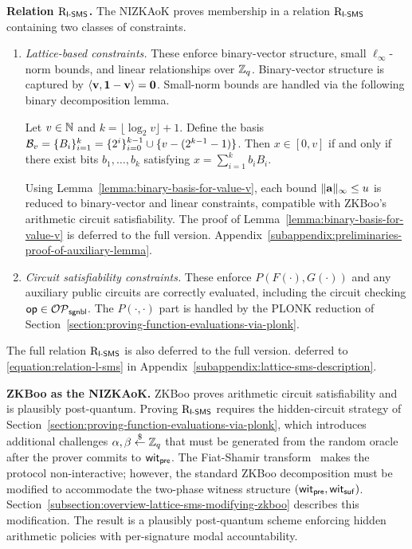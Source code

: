 \medskip
\noindent\textbf{Relation $\mathrm{R}_{\mathsf{l}\textsf{-}\mathsf{SMS}}$.}
The NIZKAoK proves membership in a relation $\mathrm{R}_{\mathsf{l}\textsf{-}\mathsf{SMS}}$
containing two classes of constraints.

\begin{enumerate}
\item \emph{Lattice-based constraints.}
These enforce binary-vector structure, small $\ell_\infty$-norm bounds,
and linear relationships over $\mathbb{Z}_q$.
Binary-vector structure is captured by $\left\langle\mathbf{v},\mathbf{1} - \mathbf{v}\right\rangle = \mathbf{0}$.
Small-norm bounds are handled via the following binary decomposition lemma.

\begin{lemma}%
	\label{lemma:binary-basis-for-value-v}
Let $v \in \mathbb{N}$ and $k = \lfloor \log_2 v \rfloor + 1$.
Define the basis
$\mathcal{B}_v = \{B_i\}_{i = 1}^k = \{2^i\}_{i = 0}^{k - 1} \cup \{v - (2^{k - 1} - 1)\}$.
Then $x \in [0, v]$ if and only if there exist bits $b_1, \ldots, b_k$
satisfying $x = \sum_{i = 1}^k b_i B_i$.
\end{lemma}

Using Lemma~\ref{lemma:binary-basis-for-value-v},
each bound $\|\mathbf{a}\|_\infty \leq u$ is reduced to binary-vector
and linear constraints,
compatible with ZKBoo's arithmetic circuit satisfiability.
The proof of Lemma~\ref{lemma:binary-basis-for-value-v} is deferred to
\ifcameraready the full version.
\else Appendix~\ref{subappendix:preliminaries-proof-of-auxiliary-lemma}.
\fi

\item \emph{Circuit satisfiability constraints.}
These enforce $P(F(\cdot), G(\cdot))$
and any auxiliary public circuits are
correctly evaluated,
including the circuit checking $\mathsf{op} \in \mathcal{OP}_\mathsf{sgnbl}$.
The $P(\cdot, \cdot)$ part is handled by the PLONK reduction
of Section~\ref{section:proving-function-evaluations-via-plonk}.
\end{enumerate}

The full relation $\mathrm{R}_{\mathsf{l}\textsf{-}\mathsf{SMS}}$ is 
\ifcameraready 
also deferred to the full version.
\else 
deferred to
\eqref{equation:relation-l-sms} in Appendix~\ref{subappendix:lattice-sms-description}.
\fi

\medskip
\noindent\textbf{ZKBoo as the NIZKAoK.}
ZKBoo proves arithmetic circuit satisfiability and is plausibly post-quantum.
Proving $\mathrm{R}_{\mathsf{l}\textsf{-}\mathsf{SMS}}$ requires the hidden-circuit strategy of
Section~\ref{section:proving-function-evaluations-via-plonk},
which introduces additional challenges $\alpha, \beta \stackrel{\$}{\gets} \mathbb{Z}_q$
that must be generated from the random oracle after the prover commits to $\mathsf{wit}_\mathsf{pre}$.
The Fiat-Shamir transform~\cite{CRYPTO:FiaSha86} makes the protocol non-interactive;
however, the standard ZKBoo decomposition must be modified to accommodate
the two-phase witness structure $(\mathsf{wit}_\mathsf{pre}, \mathsf{wit}_\mathsf{suf})$.
Section~\ref{subsection:overview-lattice-sms-modifying-zkboo} describes this modification.
The result is a plausibly post-quantum \SMS scheme enforcing hidden arithmetic policies with per-signature modal accountability.